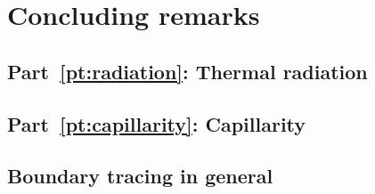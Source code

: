 \chapter{Concluding remarks}
\label{ch:concluding}

\section{Part~\ref*{pt:radiation}: Thermal radiation}
\label{sec:concluding.radiation}

\section{Part~\ref*{pt:capillarity}: Capillarity}
\label{sec:concluding.capillarity}

\section{Boundary tracing in general}
\label{sec:concluding.tracing}
